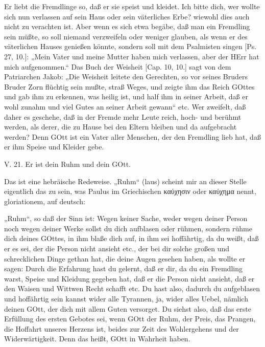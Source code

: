 Er liebt die Fremdlinge so, daß er sie speist und kleidet. Ich bitte dich, wer wollte sich nun verlassen auf sein Haus oder sein väterliches Erbe? wiewohl dies auch nicht zu verachten ist. Aber wenn es sich etwa begäbe, daß man ein Fremdling sein müßte, so soll niemand verzweifeln oder weniger glauben, als wenn er des väterlichen Hauses genießen könnte, sondern soll mit dem Psalmisten singen [Ps. 27, 10.]: „Mein Vater und meine Mutter haben mich verlassen, aber der HErr hat mich aufgenommen.“ Das Buch der Weisheit [Cap. 10, 10.] sagt von dem Patriarchen Jakob: „Die Weisheit leitete den Gerechten, so vor seines Bruders Bruder Zorn flüchtig sein mußte, straß Weges, und zeigte ihm das Reich GOttes und gab ihm zu erkennen, was heilig ist, und half ihm in seiner Arbeit, daß er wohl zunahm und viel Gutes an seiner Arbeit gewann“ etc. Wer zweifelt, daß daher es geschehe, daß in der Fremde mehr Leute reich, hoch- und berühmt werden, als derer, die zu Hause bei den Eltern bleiben und da aufgebracht werden? Denn GOtt ist ein Vater aller Menschen, der den Fremdling lieb hat, daß er ihm Speise und Kleider gebe.

\begin{schriftzitat}
V. 21. Er ist dein Ruhm und dein GOtt.
\end{schriftzitat}

Das ist eine hebräische Redeweise. „Ruhm“ (laus) scheint mir an dieser Stelle eigentlich das zu sein, was Paulus im Griechischen καύχησιν oder καύχημα nennt, gloriationem, auf deutsch:

„Ruhm“, so daß der Sinn ist: Wegen keiner Sache, weder wegen deiner Person noch wegen deiner Werke sollst du dich aufblasen oder rühmen, sondern rühme dich deines GOttes, in ihm blaße dich auf, in ihm sei hoffährtig, da du weißt, daß er es sei, der die Person nicht ansieht etc., der bei dir solche großen und schrecklichen Dinge gethan hat, die deine Augen gesehen haben, als wollte er sagen: Durch die Erfahrung hast du gelernt, daß er dir, da du ein Fremdling warst, Speise und Kleidung gegeben hat, daß er die Person nicht ansieht, daß er den Waisen und Wittwen Recht schafft etc. Du hast also, dadurch du aufgeblasen und hoffährtig sein kannst wider alle Tyrannen, ja, wider alles Uebel, nämlich deinen GOtt, der dich mit allem Guten versorget. Du siehst also, daß das erste Erfüllung des ersten Gebotes sei, wenn GOtt der Ruhm, der Preis, das Prangen, die Hoffahrt unseres Herzens ist, beides zur Zeit des Wohlergehens und der Widerwärtigkeit. Denn das heißt, GOtt in Wahrheit haben.

